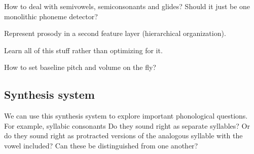 How to deal with semivowels, semiconsonants and glides?
Should it just be one monolithic phoneme detector?

Represent prosody in a second feature layer (hierarchical organization).

Learn all of this stuff rather than optimizing for it.

How to set baseline pitch and volume on the fly?

\subsection{Synthesis system}

We can use this synthesis system to explore
important phonological questions.
For example, syllabic consonants
Do they sound right as separate syllables?
Or do they sound right as protracted versions
of the analogous syllable with the vowel included?
Can these be distinguished from one another?
